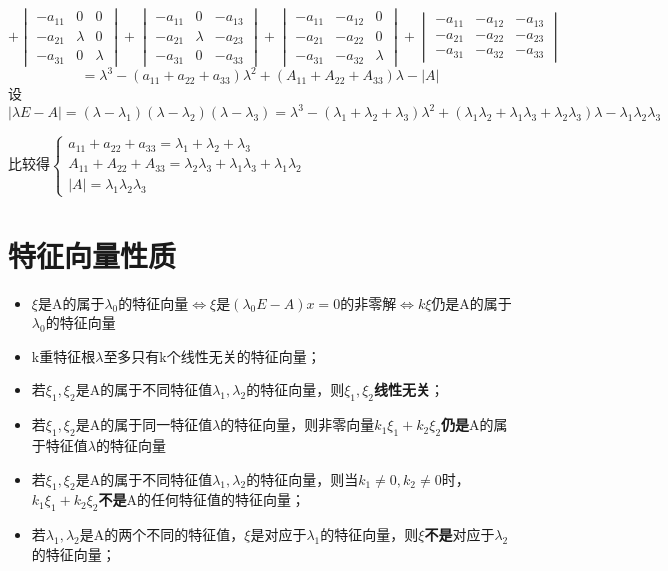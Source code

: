 \[ + \begin{vmatrix}
    -a_{11} & 0 & 0 \\ 
    -a_{21} & \lambda & 0 \\ 
    -a_{31} & 0 & \lambda
\end{vmatrix} + \begin{vmatrix}
    -a_{11} & 0 & -a_{13} \\ 
    -a_{21} & \lambda & -a_{23} \\ 
    -a_{31} & 0 & -a_{33}
\end{vmatrix} + \begin{vmatrix}
    -a_{11} & -a_{12} & 0 \\ 
    -a_{21} & -a_{22} & 0 \\ 
    -a_{31} & -a_{32} & \lambda
\end{vmatrix} + \begin{vmatrix}
    -a_{11} & -a_{12} & -a_{13} \\ 
    -a_{21} & -a_{22} & -a_{23} \\ 
    -a_{31} & -a_{32} & -a_{33}
\end{vmatrix}\]
\[ = \lambda^3 - (a_{11} + a_{22} + a_{33})\lambda^2 + (A_{11} + A_{22} + A_{33})\lambda - |A|\]
设\(|\lambda E - A| = (\lambda - \lambda_1)(\lambda - \lambda_2)(\lambda - \lambda_3) = \lambda^3 - (\lambda_1 + \lambda_2 + \lambda_3)\lambda^2 + (\lambda_1\lambda_2 + \lambda_1\lambda_3 + \lambda_2\lambda_3)\lambda - \lambda_1\lambda_2\lambda_3\)

比较得\(\begin{cases}
    a_{11} + a_{22} + a_{33} = \lambda_1 + \lambda_2 + \lambda_3 \\ 
    A_{11} + A_{22} + A_{33} = \lambda_2\lambda_3 + \lambda_1\lambda_3 + \lambda_1\lambda_2 \\ 
    |A| = \lambda_1\lambda_2\lambda_3
\end{cases}\)


\section{特征向量性质}
\begin{itemize}
    \item \(\xi\)是A的属于\(\lambda_0\)的特征向量\(\Leftrightarrow \xi\)是\((\lambda_0E - A)x = 0\)的非零解\(\Leftrightarrow k\xi\)仍是A的属于\(\lambda_0\)的特征向量
    \item k重特征根\(\lambda\)至多只有k个线性无关的特征向量；
    \item 若\(\xi_1, \xi_2\)是A的属于不同特征值\(\lambda_1, \lambda_2\)的特征向量，则\(\xi_1, \xi_2\)\textbf{线性无关}；
    \item 若\(\xi_1, \xi_2\)是A的属于同一特征值\(\lambda\)的特征向量，则非零向量\(k_1\xi_1 + k_2\xi_2\)\textbf{仍是}A的属于特征值\(\lambda\)的特征向量
    \item 若\(\xi_1, \xi_2\)是A的属于不同特征值\(\lambda_1, \lambda_2\)的特征向量，则当\(k_1 \neq 0, k_2 \neq 0\)时，\(k_1\xi_1 + k_2\xi_2\)\textbf{不是}A的任何特征值的特征向量；
    \item 若\(\lambda_1, \lambda_2\)是A的两个不同的特征值，\(\xi\)是对应于\(\lambda_1\)的特征向量，则\(\xi\)\textbf{不是}对应于\(\lambda_2\)的特征向量；
\end{itemize}


